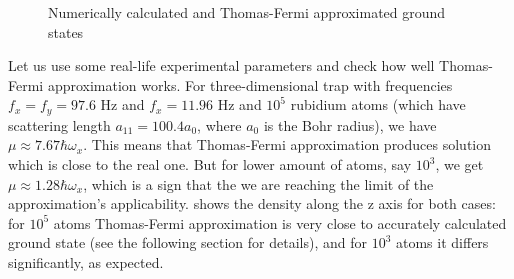 \begin{figure}
\begin{center}
\end{center}
\caption{Numerically calculated and Thomas-Fermi approximated ground states}
\label{fig:mean-field:tf-vs-accurate}
\end{figure}

Let us use some real-life experimental parameters and check how well Thomas-Fermi approximation works.
For three-dimensional trap with frequencies $f_x = f_y = 97.6 \textrm{ Hz}$ and $f_x = 11.96 \textrm{ Hz}$
and $10^5$ rubidium atoms (which have scattering length $a_{11} = 100.4 a_0$, where $a_0$ is the Bohr radius),
we have $\mu \approx 7.67 \hbar \omega_x$.
This means that Thomas-Fermi approximation produces solution which is close to the real one.
But for lower amount of atoms, say $10^3$, we get $\mu \approx 1.28 \hbar \omega_x$,
which is a sign that the we are reaching the limit of the approximation's applicability.
 shows the density along the z axis for both cases:
for $10^5$ atoms Thomas-Fermi approximation is very close to accurately calculated ground state (see the following section for details),
and for $10^3$ atoms it differs significantly, as expected.


